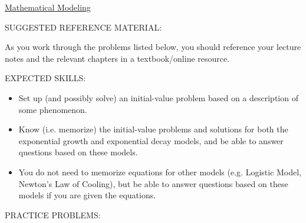 \documentclass[12pt]{article}
\begin{document}
\begin{center}
\underline{\LARGE{Mathematical Modeling}}
\end{center}

\noindent SUGGESTED REFERENCE MATERIAL:

\medskip

\noindent As you work through the problems listed below, you should reference your lecture 
notes and the relevant chapters in a textbook/online resource.

\bigskip

\noindent EXPECTED SKILLS:

\begin{itemize}

\item Set up (and possibly solve) an initial-value problem based on a description of some phenomenon.

\item Know (i.e. memorize) the initial-value problems and solutions for both the exponential growth and exponential decay models, and be able to answer questions based on these models. 

\item You do not need to memorize equations for other models (e.g. Logistic Model, Newton’s Law of Cooling), but be able to answer questions based on these models if you are given the equations.

\end{itemize}

\noindent PRACTICE PROBLEMS:
\end{document}
